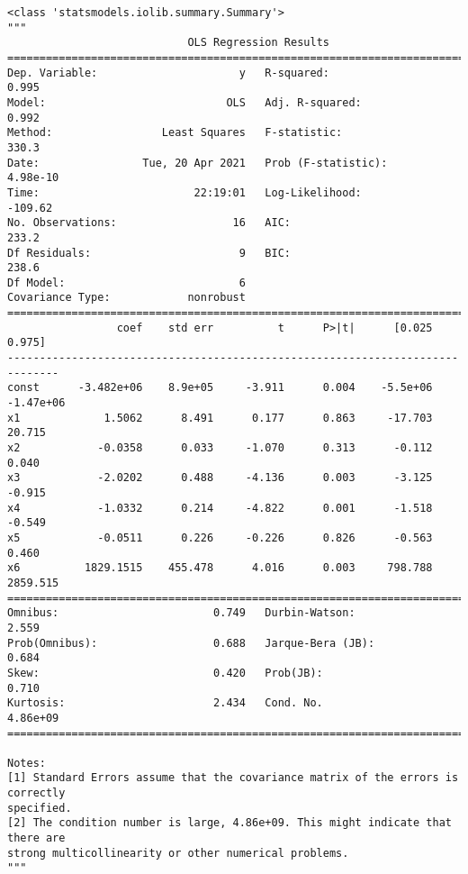 \documentclass[11pt]{ctexart}
\makeatletter
\newcommand{\boxspacing}{\kern\kvtcb@left@rule\kern\kvtcb@boxsep}
\newcommand{\prompt}[4]{
        {\ttfamily\llap{{\color{#2}[#3]:\hspace{3pt}#4}}\vspace{-\baselineskip}}
    }
\makeatother
\begin{document}
            \begin{tcolorbox}[breakable, size=fbox, boxrule=.5pt, pad at break*=1mm, opacityfill=0]
\prompt{Out}{outcolor}{2}{\boxspacing}
\begin{Verbatim}[commandchars=\\\{\}]
<class 'statsmodels.iolib.summary.Summary'>
"""
                            OLS Regression Results
==============================================================================
Dep. Variable:                      y   R-squared:                       0.995
Model:                            OLS   Adj. R-squared:                  0.992
Method:                 Least Squares   F-statistic:                     330.3
Date:                Tue, 20 Apr 2021   Prob (F-statistic):           4.98e-10
Time:                        22:19:01   Log-Likelihood:                -109.62
No. Observations:                  16   AIC:                             233.2
Df Residuals:                       9   BIC:                             238.6
Df Model:                           6
Covariance Type:            nonrobust
==============================================================================
                 coef    std err          t      P>|t|      [0.025      0.975]
------------------------------------------------------------------------------
const      -3.482e+06    8.9e+05     -3.911      0.004    -5.5e+06   -1.47e+06
x1             1.5062      8.491      0.177      0.863     -17.703      20.715
x2            -0.0358      0.033     -1.070      0.313      -0.112       0.040
x3            -2.0202      0.488     -4.136      0.003      -3.125      -0.915
x4            -1.0332      0.214     -4.822      0.001      -1.518      -0.549
x5            -0.0511      0.226     -0.226      0.826      -0.563       0.460
x6          1829.1515    455.478      4.016      0.003     798.788    2859.515
==============================================================================
Omnibus:                        0.749   Durbin-Watson:                   2.559
Prob(Omnibus):                  0.688   Jarque-Bera (JB):                0.684
Skew:                           0.420   Prob(JB):                        0.710
Kurtosis:                       2.434   Cond. No.                     4.86e+09
==============================================================================

Notes:
[1] Standard Errors assume that the covariance matrix of the errors is correctly
specified.
[2] The condition number is large, 4.86e+09. This might indicate that there are
strong multicollinearity or other numerical problems.
"""
\end{Verbatim}
\end{tcolorbox}
        
\end{document}
